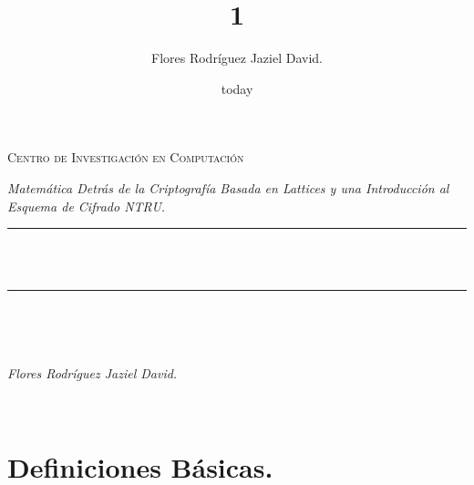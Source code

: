 \documentclass[12pt]{report}
\title{1}
\author{Flores Rodríguez Jaziel David.}
\date{today}
\makeatletter
\let\thetitle\@title
\makeatother
\begin{document}

\begin{titlepage}
	\centering
    \vspace*{0.5 cm}
\begin{center} \textsc{\Large  Centro de Investigación en Computación}\\[2.0 cm]\end{center}
\begin{center}\textit{Matemática Detrás de la Criptografía Basada en Lattices y una Introducción al Esquema de Cifrado NTRU. }\\[2.0 cm]\end{center}
	\rule{\linewidth}{0.2 mm} \\[0.4 cm]
	{ \huge \bfseries \thetitle}\\
	\rule{\linewidth}{0.2 mm} \\[1.5 cm]
	
	\begin{minipage}{0.4\textwidth}
		\begin{flushleft} \large
			\end{flushleft}
			\end{minipage}~
			\begin{minipage}{0.4\textwidth}
			\begin{flushright} \large
			\emph{Flores Rodríguez Jaziel David.} \\  
		\end{flushright}
           
	\end{minipage}\\[2 cm]
	 
\end{titlepage}


\tableofcontents
\pagebreak

\renewcommand{\thesection}{\arabic{section}}

\section{Definiciones Básicas.}
 
\end{document}
